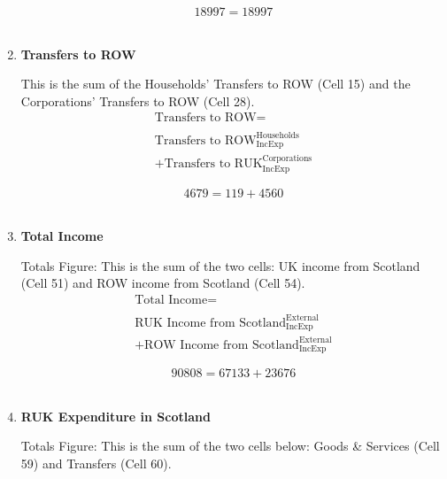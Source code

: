 \begin{enumerate}
\begin{equation} \nonumber
18997 = 18997
\end{equation}\\


\item \textbf {Transfers to ROW}

This is the sum of the Households' Transfers to ROW (Cell 15) and the Corporations' Transfers to ROW (Cell 28).\\

\begin{equation}
\begin{split}
\text{Transfers to ROW} =  \\ \\
\text{Transfers to ROW}^\text{Households}_\text{IncExp}\\
+\text{Transfers to RUK}^\text{Corporations}_\text{IncExp}
\end{split} \label{eq:2.5.60}
\end{equation}

\begin{equation} \nonumber
4679 = 119+4560
\end{equation}\\

\newpage

\item \textbf {Total Income}

Totals Figure: This is the sum of the two cells: UK income from Scotland (Cell 51) and ROW income from Scotland (Cell 54).\\

\begin{equation}
\begin{split}
\text{Total Income} =  \\ \\
\text{RUK Income from Scotland}^\text{External}_\text{IncExp}\\
+\text{ROW Income from Scotland}^\text{External}_\text{IncExp}
\end{split} \label{eq:2.5.61}
\end{equation}

\begin{equation} \nonumber
90808 = 67133+23676
\end{equation}\\


\item \textbf {RUK Expenditure in Scotland}

Totals Figure: This is the sum of the two cells below: Goods \& Services (Cell 59) and Transfers (Cell 60).\\


\end{enumerate}
